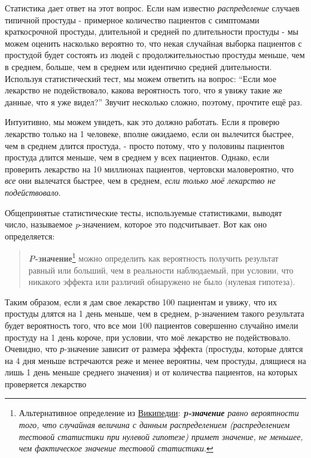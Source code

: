Статистика дает ответ на этот вопрос. Если нам известно \emph{распределение} случаев типичной простуды - примерное количество пациентов с симптомами краткосрочной простуды, длительной и средней по длительности простуды - мы можем оценить насколько вероятно то, что некая случайная выборка пациентов с простудой будет состоять из людей с продолжительностью простуды меньше, чем в среднем, больше, чем в среднем или идентично средней длительности. Используя статистический тест, мы можем ответить на вопрос: ``Если мое лекарство не подействовало, какова вероятность того, что я увижу такие же данные, что я уже видел?''
Звучит несколько сложно, поэтому, прочтите ещё раз.


Интуитивно, мы можем увидеть, как это должно работать. Если я проверю лекарство только на 1 человеке, вполне ожидаемо, если он вылечится быстрее, чем в среднем длится простуда, - просто потому, что у половины пациентов простуда длится меньше, чем в среднем у всех пациентов. Однако, если проверить лекарство на 10 миллионах пациентов, чертовски маловероятно, что \emph{все} они вылечатся быстрее, чем в среднем, \emph{если только моё лекарство не подействовало}.    

Общепринятые статистические тесты, используемые статистиками, выводят число, называемое \emph{p}-значением, которое это подсчитывает. Вот как оно определяется:

\begin{quotation}

\textbf{\emph{P}-значение}\footnote{Альтернативное определение из \href{http://goo.gl/JHujIw}{Википедии}: \textit{\textbf{p-значение} равно вероятности того, что случайная величина с данным распределением (распределением тестовой статистики при нулевой гипотезе) примет значение, не меньшее, чем фактическое значение тестовой статистики}.} можно определить как вероятность получить результат равный или больший, чем в реальности наблюдаемый, при условии, что никакого эффекта или различий обнаружено не было (нулевая гипотеза).\cite{goodman_toward_1999}   

\end{quotation}


Таким образом, если я дам свое лекарство 100 пациентам и увижу, что их простуды длятся на 1 день меньше, чем в среднем, р-значением такого результата будет вероятность того, что все мои 100 пациентов совершенно случайно имели простуду на 1 день короче, при условии, что моё лекарство не подействовало. Очевидно, что \emph{р}-значение зависит от размера эффекта (простуды, которые длятся на 4 дня меньше встречаются реже и менее вероятны, чем простуды, длящиеся на лишь 1 день меньше среднего значения) и от количества пациентов, на которых проверяется лекарство  


